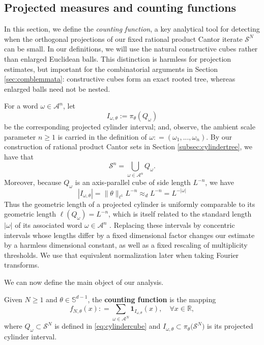 \documentclass[12pt]{amsart}
\numberwithin{equation}{section}
\begin{document}
\subsection{Projected measures and counting functions}
In this section, we define the \textit{counting function}, a key analytical tool for detecting when the orthogonal projections of our fixed rational product Cantor iterate $\mathcal{S}^N$ can be small. In our definitions, we will use the natural constructive cubes rather than enlarged Euclidean balls. This distinction is harmless for projection estimates, but important for the combinatorial arguments in Section \ref{sec:comblemmata}: constructive cubes form an exact rooted tree, whereas enlarged balls need not be nested.

For a word $\omega\in\mathcal A^n$, let
$$
I_{\omega,\theta}:=\pi_\theta(Q_\omega)
$$
be the corresponding projected cylinder interval; and, observe, the ambient scale parameter $n \geq 1$ is carried in the definition of $\omega : = (\omega_1,...,\omega_n)$. By our construction of rational product Cantor sets in Section \ref{subsec:cylindertree}, we have that
$$
\mathcal S^n=\bigcup_{\omega\in\mathcal A^n}Q_\omega.
$$
Moreover, because $Q_\omega$ is an axis-parallel cube of side length $L^{-n}$, we have
\begin{equation}\label{eq:projectedcylinderlength}
|I_{\omega,\theta}|=\|\theta\|_{\ell^1}L^{-n}\approx_d L^{-n} = L^{- \lvert \omega \rvert}
\end{equation}
Thus the geometric length of a projected cylinder is uniformly comparable to its geometric length $\ell(Q_\omega)=L^{-n}$, which is itself related to the standard length $\lvert \omega \rvert$ of its associated word $\omega \in \mathcal{A}^n$ . Replacing these intervals by concentric intervals whose lengths differ by a fixed dimensional factor changes our estimate by a harmless dimensional constant, as well as a fixed rescaling of multiplicity thresholds. We use that equivalent normalization later when taking Fourier transforms.

We can now define the main object of our analysis.

\begin{definition}
    Given $N \geq 1$ and $\theta \in \mathbb{S}^{d-1}$, the \textbf{counting function} is the mapping
    $$
    f_{N,\theta} (x) : = \sum\limits_{\omega \in \mathcal{A}^N} \mathbf{1}_{I_{\omega,\theta}} (x), \quad \forall x \in \mathbb{R},
    $$
    where $Q_\omega \subset \mathcal{S}^N$ is defined in \eqref{eq:cylindercube} and $I_{\omega,\theta} \subset \pi_{\theta} \big(\mathcal{S}^N\big)$ is its projected cylinder interval.
\end{definition}
\end{document}
